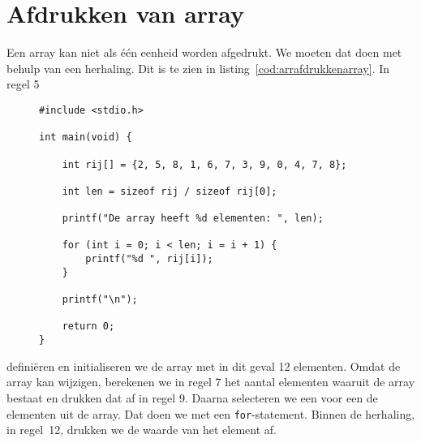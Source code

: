 \section{Afdrukken van array}
Een array kan niet als één eenheid worden afgedrukt. We moeten dat doen met behulp van een herhaling. Dit is te zien in listing~\ref{cod:arrafdrukkenarray}. In regel 5 %
\begin{figure}[!ht]
\begin{lstlisting}[caption=Afdrukken van een array.,label=cod:arrafdrukkenarray]
#include <stdio.h>

int main(void) {

    int rij[] = {2, 5, 8, 1, 6, 7, 3, 9, 0, 4, 7, 8};

    int len = sizeof rij / sizeof rij[0];

    printf("De array heeft %d elementen: ", len);

    for (int i = 0; i < len; i = i + 1) {
        printf("%d ", rij[i]);
    }

    printf("\n");
    
    return 0;
}
\end{lstlisting}
\end{figure}
%
definiëren en initialiseren we de array met in dit geval 12 elementen. Omdat de array kan wijzigen, berekenen we in regel 7 het aantal elementen waaruit de array bestaat en drukken dat af in regel 9. Daarna selecteren we een voor een de elementen uit de array. Dat doen we met een \texttt{for}-statement. Binnen de herhaling, in regel~12, drukken we de waarde van het element af.



